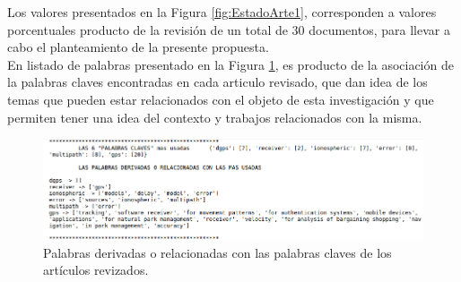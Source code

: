 Los valores presentados en la Figura \ref{fig:EstadoArte1}, corresponden a valores porcentuales producto de la revisión de un total de 30 documentos, para llevar a cabo el planteamiento de la presente propuesta.\\

En listado de palabras presentado en la Figura \ref{fig:Relativewords}, es producto de la asociación de la palabras claves encontradas en cada articulo revisado, que dan idea de los temas que pueden estar relacionados con el objeto de esta investigación y que permiten tener una idea del contexto y trabajos relacionados con la misma. 

\begin{figure}[h]
	\centering
    \includegraphics[scale=0.5]{Imagenes/ReporteBiblio/Relative_words.png}
	\caption{Palabras derivadas o relacionadas con las palabras claves de los artículos revizados.}
	\label{fig:Relativewords}
\end{figure}




